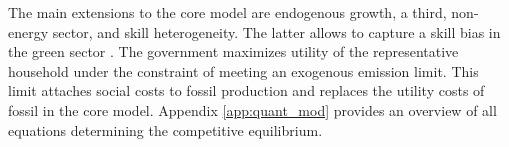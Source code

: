 The main extensions to the core model are endogenous growth, a third, non-energy sector, and skill heterogeneity. The latter allows to capture a skill bias in the green sector \citep{Consoli2016DoCapital}. 
The government maximizes utility of the representative household under the constraint of meeting an exogenous emission limit. This limit attaches social costs to fossil production and replaces the utility costs of fossil in the core model. 
Appendix \ref{app:quant_mod} provides an overview of all equations determining the competitive equilibrium.


